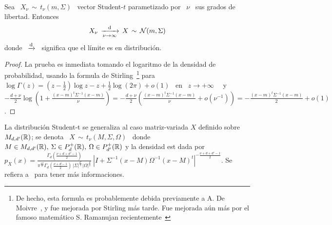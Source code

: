 \begin{lema}
\label{Lem:MP:LimiteGaussiana}
%
  Sea \ $X_\nu \, \sim \, t_\nu(m,\Sigma)$ \ vector Student-$t$ parametizado por
  \ $\nu$ \ sus grados de libertad. Entonces
  \[
  X_\nu \, \xrightarrow[\nu \to \infty]{\mathrm{d}} \, X \, \sim \, \mathcal{N}(m,\Sigma)
  \]
  donde  \  $\displaystyle  \xrightarrow[]{\mathrm{d}}$  \   significa  que  el  l\'imite  es  en
  distribuci\'on.
\end{lema}
\begin{proof}
  La prueba  es inmediata tomando el  logaritmo de la  densidad de probabilidad,
  usando   la  formula   de   Stirling~\footnote{De  hecho,   esta  formula   es
    probablemente debida previamente a  A.  De Moivre~\cite{Dem56, Pea24, Cam86,
      Dut91}, y fue mejorada por  Stirling m\'as tarde. Fue mejorada a\'un m\'as
    por         el        famoso        matem\'atico         S.        Ramanujan
    recientemente~\cite[\S~4.1]{AndBer13}}  para \ $\log\Gamma(z)  = \left(  z -
    \frac12 \right)  \log z  - z +  \frac12 \log(2 \pi)  + o(1)$  \ en \  $z \to
  +\infty$~\cite{Sti30, AbrSte70, GraRyz15} \ y \ $-\frac{d+\nu}{2} \log\left( 1
    +  \frac{(x-m)^t \Sigma^{-1} (x-m)}{\nu}  \right) =  -\frac{d+\nu}{2} \left(
    \frac{(x-m)^t \Sigma^{-1} (x-m)}{\nu} + o\left( \nu^{-1} \right) \right) = -
  \frac{(x-m)^t \Sigma^{-1} (x-m)}{2} + o(1)$.
\end{proof}




La distribuci\'on  Student-t se generaliza  al caso matriz-variada  $X$ definido
sobre $M_{d,d'}(\mathbb{R})$;  se denota  \ $X \,  \sim \,  t_\nu(M,\Sigma,\Omega)$ \
donde  \ $M  \in  M_{d,d'}(\mathbb{R}), \:  \Sigma  \in P_d^+(\mathbb{R}),  \: \Omega  \in
P_{d'}^+(\mathbb{R})$   y  la  densidad   est  dada   por  $\displaystyle   p_X(x)  =
\frac{\Gamma_d\left(      \frac{\nu+d+d'-1}{2}\right)}{\pi^{\frac{\nu     d}{2}}
  \Gamma_d\left(       \frac{\nu+d-1}{2}\right)      \,       \left|      \Sigma
  \right|^{\frac{d'}{2}}  \left|  \Omega \right|^{\frac{d}{2}}}  \:  \left| I  +
  \Sigma^{-1}  (x-M) \Omega^{-1}  (x-M)^t \right|^{-  \frac{\nu+d+d'-1}{2}}$. Se
refiera a~\cite[Cap.~4]{GupNag99} para tener m\'as informaciones.